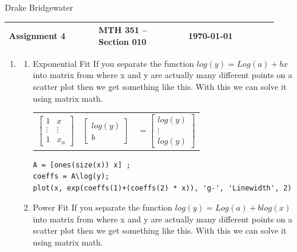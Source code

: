 \documentclass{article}
\def\name{Drake Bridgewater}
\begin{document}
\hfill \name

\begin{center}

\large
\begin{tabular}{L{0.3\linewidth} C{0.3\linewidth} R{0.3\linewidth}}
\hline
Assignment 4    &MTH 351 -- Section 010        &\today \\
\hline
\end{tabular}
\vspace{-0.2cm}
\end{center}
\begin{enumerate}
\item 
\begin{mdframed}[style=MyFrame]
\begin{enumerate}
\item Exponential Fit
If you separate the function $log(y) = Log(a) +b x$ into matrix from where x and y are actually many different points on a scatter plot then we get something like this. With this we can solve it using matrix math.\\
\begin{tabular}{p{1.5cm} p{1.3cm} p{1.3cm}}
\begin{equation*}
\begin{bmatrix}
1 & x\\
\vdots & \vdots \\
1 & x_n
\end{bmatrix}
\end{equation*}
&
\begin{equation*}
\begin{bmatrix}
log(y)\\
b
\end{bmatrix}
\end{equation*}
&
\begin{equation*}
=\begin{bmatrix}
log(y)\\
\vdots \\
log(y)
\end{bmatrix}
\end{equation*}
\vspace{-.1cm}
\end{tabular}
\begin{verbatim}
A = [ones(size(x)) x] ;
coeffs = A\log(y);
plot(x, exp(coeffs(1)+(coeffs(2) * x)), 'g-', 'Linewidth', 2)
\end{verbatim}
\item Power Fit
If you separate the function $log(y) = Log(a) + b log(x)$ into matrix from where x and y are actually many different points on a scatter plot then we get something like this. With this we can solve it using matrix math.\\

\end{enumerate}
\end{mdframed}
\end{enumerate}
\end{document}
